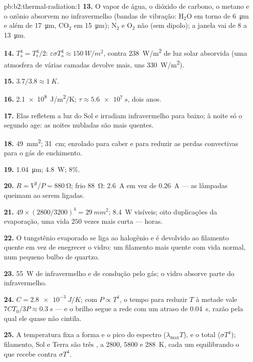 \begin{solution}{pb:b2:thermal-radiation:1}
\textbf{13.} O vapor de água, o dióxido de carbono, o metano e o ozônio absorvem no
infravermelho (bandas de vibração: H$_2$O em torno de \qty{6}{\micro m} e além de
\qty{17}{\micro m}, CO$_2$ em \qty{15}{\micro m}); N$_2$ e O$_2$ não (sem
dipolo); a janela vai de \qty{8}{} a \qty{13}{\micro m}.

\textbf{14.} $T_{\text{a}}^4 = T_{\text{s}}^4/2$: $\varepsilon\sigma T_{\text{a}}^4 \approx
\qty{150}{W/m^2}$, contra \qty{238}{W/m^2} de luz solar absorvida (uma
atmosfera de várias camadas devolve mais, uns \qty{330}{W/m^2}).

\textbf{15.} $3.7/3.8 \approx \qty{1}{K}$.

\textbf{16.} \qty{2.1e8}{J/m^2/K}; $\tau \approx \qty{5.6e7}{s}$, dois anos.

\textbf{17.} Elas refletem a luz do Sol e irradiam infravermelho para baixo; à noite
só o segundo age: as noites nubladas são mais quentes.

\textbf{18.} \qty{49}{mm^2}; \qty{31}{cm}; enrolado para caber e para reduzir
as perdas convectivas para o gás de enchimento.

\textbf{19.} \qty{1.04}{\micro m}; \qty{4.8}{W}; $8\%$.

\textbf{20.} $R = V^2/P = \qty{880}{\ohm}$; frio \qty{88}{\ohm}: \qty{2.6}{A}
em vez de \qty{0.26}{A} --- as lâmpadas queimam ao serem ligadas.

\textbf{21.} $49 \times (2800/3200)^4 = \qty{29}{mm^2}$; \qty{8.4}{W} visíveis; oito
duplicações da evaporação, uma vida $250$ vezes mais curta --- horas.

\textbf{22.} O tungstênio evaporado se liga ao halogênio e é devolvido
ao filamento quente em vez de enegrecer o vidro: um filamento mais quente
com vida normal, num pequeno bulbo de quartzo.

\textbf{23.} \qty{55}{W} de infravermelho e de condução pelo gás; o
vidro absorve parte do infravermelho.

\textbf{24.} $C = \qty{2.8e-3}{J/K}$; com $P \propto T^4$, o tempo para reduzir $T$ à metade
vale $7CT_0/3P \approx \qty{0.3}{s}$ --- e o brilho segue a rede
com um atraso de \qty{0.04}{s}, razão pela qual ele quase não cintila.

\textbf{25.} A temperatura fixa a forma e o pico do espectro
($\lambda_{\max}T$), e o total ($\sigma T^4$); filamento, Sol e Terra
são três , a \qty{2800}{}, \qty{5800}{} e \qty{288}{K}, cada um
equilibrando o que recebe contra $\sigma T^4$.
\end{solution}
